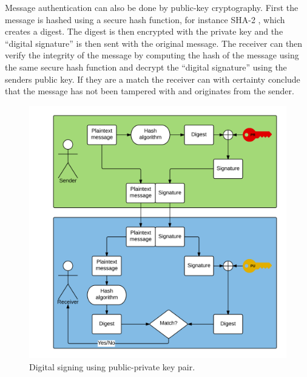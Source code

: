 Message authentication can also be done by public-key cryptography. First the message is hashed using a secure hash function, for instance SHA-2 \cite{shaRFC}, which creates a digest. The digest is then encrypted with the private key and the ``digital signature'' is then sent with the original message. The receiver can then verify the integrity of the message by computing the hash of the message using the same secure hash function and decrypt the ``digital signature'' using the senders public key. If they are a match the receiver can with certainty conclude that the message has not been tampered with and originates from the sender.

\begin{figure}[h!]
  \captionsetup{justification=centering,margin=1.5cm}
  \caption{Digital signing using public-private key pair.}
  \label{fig:signing_basic}
  \centering
    \includegraphics[width=1\textwidth]{images/signing_basic.png}
\end{figure}

